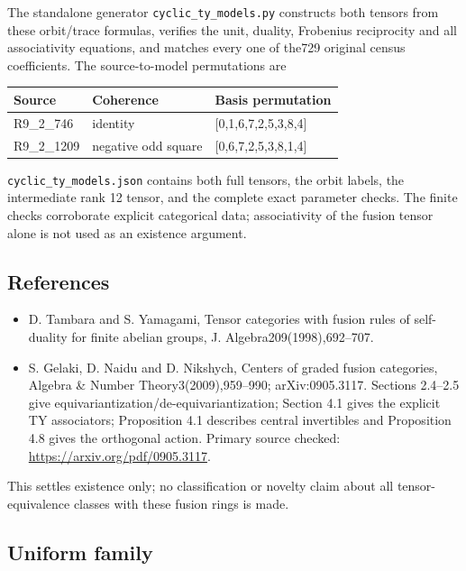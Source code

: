 The standalone generator
\texttt{cyclic\allowbreak{}\_\allowbreak{}ty\_\allowbreak{}models\allowbreak{}.\allowbreak{}py}
constructs both tensors from these orbit/trace formulas, verifies the
unit, duality, Frobenius reciprocity and all associativity equations,
and matches every one of the729 original census coefficients. The
source-to-model permutations are

\begin{longtable}[]{@{}lll@{}}
\toprule\noalign{}
Source & Coherence & Basis permutation \\
\midrule\noalign{}
\endhead
\bottomrule\noalign{}
\endlastfoot
R9\_2\_746 & identity & {[}0,1,6,7,2,5,3,8,4{]} \\
R9\_2\_1209 & negative odd square & {[}0,6,7,2,5,3,8,1,4{]} \\
\end{longtable}

\texttt{cyclic\allowbreak{}\_\allowbreak{}ty\_\allowbreak{}models\allowbreak{}.\allowbreak{}json}
contains both full tensors, the orbit labels, the intermediate rank 12
tensor, and the complete exact parameter checks. The finite checks
corroborate explicit categorical data; associativity of the fusion
tensor alone is not used as an existence argument.

\hypertarget{references}{%
\subsection{References}\label{references}}

\begin{itemize}
\tightlist
\item
  D. Tambara and S. Yamagami, Tensor categories with fusion rules of
  self-duality for finite abelian groups, J. Algebra209(1998),692--707.
\item
  S. Gelaki, D. Naidu and D. Nikshych, Centers of graded fusion
  categories, Algebra \& Number Theory3(2009),959--990; arXiv:0905.3117.
  Sections 2.4--2.5 give equivariantization/de-equivariantization;
  Section 4.1 gives the explicit TY associators; Proposition 4.1
  describes central invertibles and Proposition 4.8 gives the orthogonal
  action. Primary source checked: \url{https://arxiv.org/pdf/0905.3117}.
\end{itemize}

This settles existence only; no classification or novelty claim about
all tensor-equivalence classes with these fusion rings is made.

\hypertarget{uniform-family}{%
\subsection{Uniform family}\label{uniform-family}}

